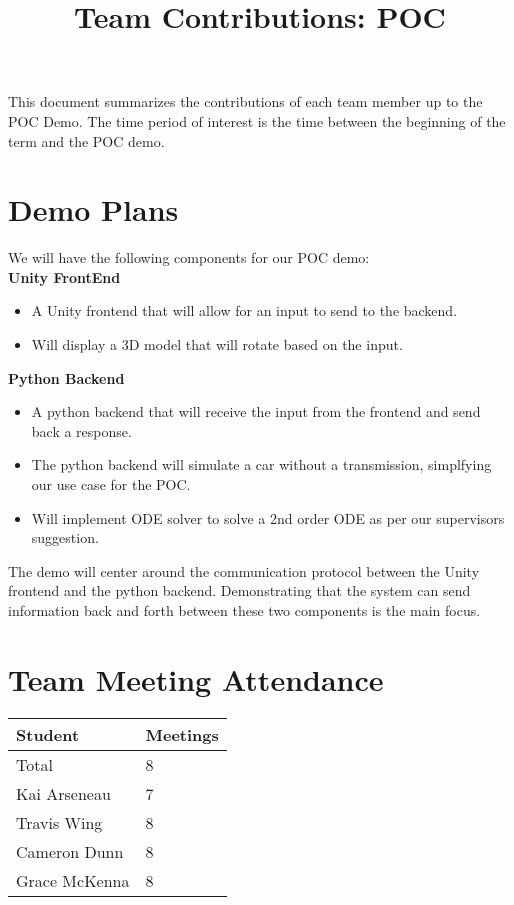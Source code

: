 \documentclass{article}
\title{Team Contributions: POC\\\progname}
\author{\authname}
\date{}
\begin{document}
\maketitle

This document summarizes the contributions of each team member up to the POC
Demo.  The time period of interest is the time between the beginning of the term
and the POC demo.

\section{Demo Plans}

We will have the following components for our POC demo:\\

\noindent
\textbf{Unity FrontEnd}
\begin{itemize}
  \item A Unity frontend that will allow for an input to send to the backend.
  \item Will display a 3D model that will rotate based on the input.
\end{itemize}
\noindent
\textbf{Python Backend}
\begin{itemize}
  \item A python backend that will receive the input from the frontend and send back a response.
  \item The python backend will simulate a car without a transmission, simplfying our use case for the POC.
  \item Will implement ODE solver to solve a 2nd order ODE as per our supervisors suggestion.
\end{itemize}
\noindent
The demo will center around the communication protocol between the Unity frontend and the python backend.
Demonstrating that the system can send information back and forth between these two components is the main focus.

\section{Team Meeting Attendance}

\begin{table}[H]
\centering
\begin{tabular}{ll}
\toprule
\textbf{Student} & \textbf{Meetings}\\
\midrule
Total & 8\\
Kai Arseneau & 7\\
Travis Wing & 8\\
Cameron Dunn & 8\\
Grace McKenna & 8\\
\bottomrule
\end{tabular}
\end{table}
\end{document}
